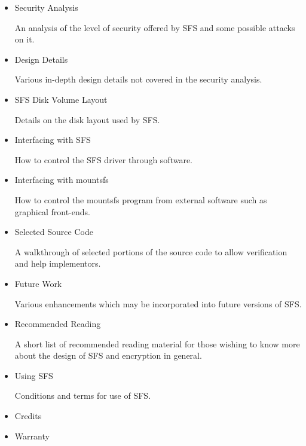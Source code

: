\begin{itemize}
\item Security Analysis

        An analysis of the level of security offered by SFS and
        some possible attacks on it.

\item Design Details

        Various in-depth design details not covered in the security
        analysis.

\item SFS Disk Volume Layout

        Details on the disk layout used by SFS.

\item Interfacing with SFS

        How to control the SFS driver through software.

\item Interfacing with mountsfs

        How to control the mountsfs program from external software such
        as graphical front-ends.

\item Selected Source Code

        A walkthrough of selected portions of the source code to allow
        verification and help implementors.

\item Future Work

        Various enhancements which may be incorporated into future
        versions of SFS.

\item Recommended Reading

        A short list of recommended reading material for those wishing
        to know more about the design of SFS and encryption in general.

\item Using SFS

        Conditions and terms for use of SFS.

\item Credits
\item Warranty

\end{itemize}

